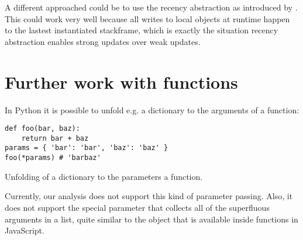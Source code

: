 A different approached could be to use the recency abstraction as introduced by \cite{recency}. This could work very well because all writes to local objects at runtime happen to the lastest instantiated stackframe, which is exactly the situation recency abstraction enables strong updates over weak updates.

\section{Further work with functions}
In Python it is possible to unfold e.g. a dictionary to the arguments of a function:

\begin{listing}[H]
	\begin{verbatim}
def foo(bar, baz):
	return bar + baz
params = { 'bar': 'bar', 'baz': 'baz' }
foo(*params) # 'barbaz'
	\end{verbatim}
\caption{Unfolding of a dictionary to the parameters a function.}\label{code:UnfoldDictFunctionExample}
\end{listing}

Currently, our analysis does not support this kind of parameter passing. Also, it does not support the special  parameter that collects all of the superfluous arguments in a list, quite similar to the  object that is available inside functions in JavaScript.
